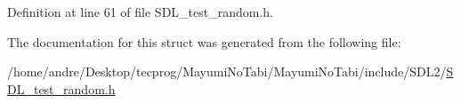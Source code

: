Definition at line 61 of file S\-D\-L\-\_\-test\-\_\-random.\-h.



The documentation for this struct was generated from the following file\-:\begin{DoxyCompactItemize}
\item 
/home/andre/\-Desktop/tecprog/\-Mayumi\-No\-Tabi/\-Mayumi\-No\-Tabi/include/\-S\-D\-L2/\hyperlink{_s_d_l__test__random_8h}{S\-D\-L\-\_\-test\-\_\-random.\-h}\end{DoxyCompactItemize}
